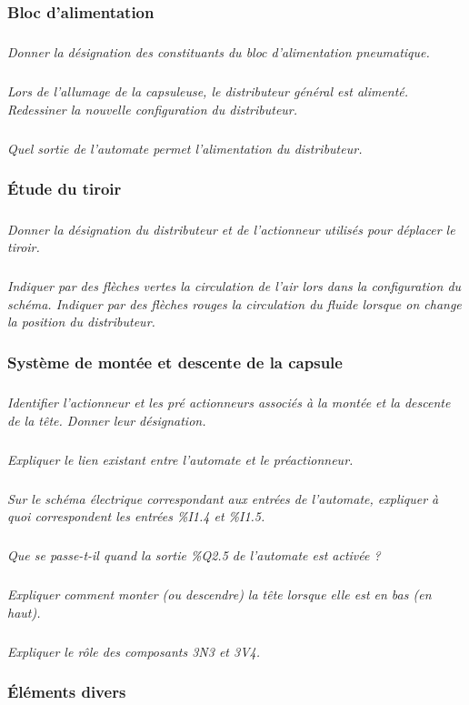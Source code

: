 \documentclass[10pt]{article}
\begin{document}
\newpage{}

\subsubsection*{Bloc d'alimentation}
\subparagraph{}
\textit{Donner la désignation des constituants du bloc d'alimentation pneumatique.}

\subparagraph{}
\textit{Lors de l'allumage de la capsuleuse, le distributeur général est alimenté. Redessiner la nouvelle configuration du distributeur.}

\subparagraph{}
\textit{Quel sortie de l'automate permet l'alimentation du distributeur.}

\subsubsection*{Étude du tiroir}
\subparagraph{}
\textit{Donner la désignation du distributeur et de l'actionneur utilisés pour déplacer le tiroir.}

\subparagraph{}
\textit{Indiquer par des flèches vertes la circulation de l'air lors dans la configuration du schéma. Indiquer par des flèches rouges la circulation du fluide lorsque on change la position du distributeur.}

\subsubsection*{Système de montée et descente de la capsule}
\subparagraph{}
\textit{Identifier l'actionneur et les pré actionneurs associés à la montée et la descente de la tête. Donner leur désignation.}

\subparagraph{}
\textit{Expliquer le lien existant entre l'automate et le préactionneur. }

\subparagraph{}
\textit{Sur le schéma électrique correspondant aux entrées de l'automate, expliquer à quoi correspondent les entrées \%I1.4 et \%I1.5.}

\subparagraph{}
\textit{Que se passe-t-il quand la sortie \%Q2.5 de l'automate est activée ?}

\subparagraph{}
\textit{Expliquer comment monter (ou descendre) la tête lorsque elle est en bas (en haut).}

\subparagraph{}
\textit{Expliquer le rôle des composants 3N3 et 3V4.}

\subsubsection*{Éléments divers}
\end{document}
